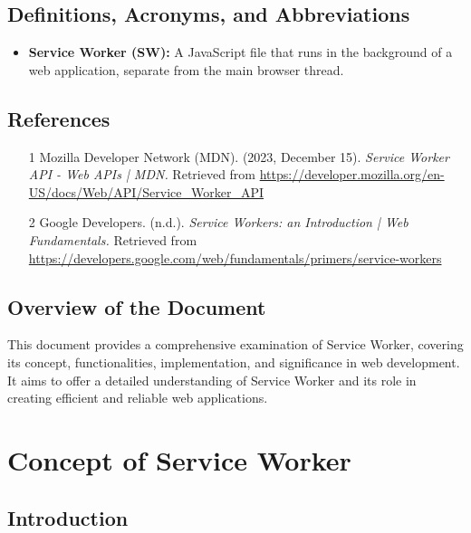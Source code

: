 \documentclass[12pt, a4paper, twoside]{article}
\begin{document}
\subsection{Definitions, Acronyms, and Abbreviations}
\label{sec:definitions}

\begin{itemize}
  \item \textbf{Service Worker (SW):} A JavaScript file that runs in the background of a web application, separate from the main browser thread.
\end{itemize}

\subsection{References}
\label{sec:references}

\begin{enumerate}
    \item [1] Mozilla Developer Network (MDN). (2023, December 15). 
    \textit{Service Worker API - Web APIs | MDN.} Retrieved from \url{https://developer.mozilla.org/en-US/docs/Web/API/Service_Worker_API}
      
    \item [2] Google Developers. (n.d.). 
    \textit{Service Workers: an Introduction | Web Fundamentals.} Retrieved from \url{https://developers.google.com/web/fundamentals/primers/service-workers}
\end{enumerate}

\subsection{Overview of the Document}
\label{sec:overview}

This document provides a comprehensive examination of Service Worker, covering its concept, functionalities, implementation, and significance in web development. It aims to offer a detailed understanding of Service Worker and its role in creating efficient and reliable web applications.

\newpage

\section{Concept of Service Worker}
\label{sec:service-worker-concept}

\subsection{Introduction}
\label{subsec:sw-concept-intro}
\end{document}
